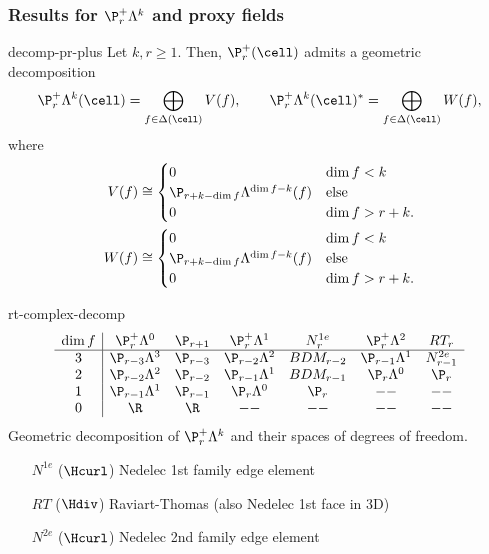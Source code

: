 \subsubsection{Results for $\P_r^+\Lambda^k$ and proxy fields}


\begin{Theorem}{decomp-pr-plus}
  Let $k,r\ge 1$. Then, $\P_r^+(\cell)$ admits a geometric decomposition
  \begin{gather}
    \P_r^+\Lambda^k(\cell) = \bigoplus_{f\in\Delta(\cell)} V(f),
    \qquad
    \P_r^+\Lambda^k(\cell)^* = \bigoplus_{f\in\Delta(\cell)} W(f),
  \end{gather}
  where
  \begin{align}
    V(f) \cong
    \begin{cases}
      0 & \dim f < k\\
      \P_{r+k-\dim f} \Lambda^{\dim f-k}(f) &\text{else}\\
      0 & \dim f > r+k.
    \end{cases}
    \\
    W(f) \cong
    \begin{cases}
      0 & \dim f < k\\
      \P_{r+k-\dim f} \Lambda^{\dim f-k}(f) &\text{else}\\
      0 & \dim f > r+k.
    \end{cases}
  \end{align}
\end{Theorem}

\begin{Example}{rt-complex-decomp}
  \begin{gather}
    \begin{array}{c|cccccc}
      \dim f
      & \P_r^+\Lambda^0 & \P_{r+1}
      & \P_r^+\Lambda^1 & N^{1e}_r
      & \P_r^+\Lambda^2 & RT_r \\\hline
      3 & \P_{r-3}\Lambda^3 & \P_{r-3} & \P_{r-2}\Lambda^2 & BDM_{r-2} & \P_{r-1}\Lambda^1 & N^{2e}_{r-1} \\
      2 & \P_{r-2}\Lambda^2 & \P_{r-2} & \P_{r-1}\Lambda^1 & BDM_{r-1} & \P_{r}\Lambda^0 & \P_r\\
      1 & \P_{r-1}\Lambda^1 & \P_{r-1} & \P_{r}\Lambda^0   & \P_r  & -- & -- \\
      0 & \R & \R & -- & -- & --& --
    \end{array}
  \end{gather}
  Geometric decomposition of $\P_r^+\Lambda^k$ and their spaces of degrees of freedom.
  \begin{itemize}
  \item [$N^{1e}$] ($\Hcurl$) Nedelec 1st family edge element
  \item [$RT$] ($\Hdiv$) Raviart-Thomas (also Nedelec 1st face in 3D)
  \item [$N^{2e}$] ($\Hcurl$) Nedelec 2nd family edge element
  \end{itemize}
\end{Example}

